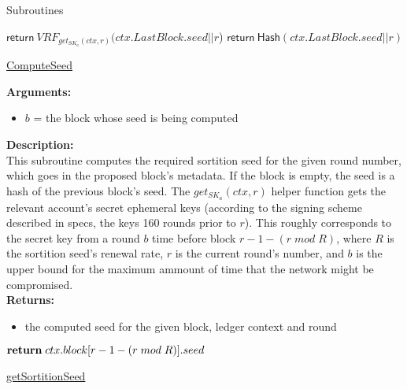 \documentclass[10pt,a4paper]{article}
\begin{document}
\begin{section}{Subroutines}
\begin{algorithm}[H]\label{algo:compute-seed}
    \begin{algorithmic}[1]
            \State $\mathsf{return} \ VRF_{get_{SK_a}(ctx, r)}(ctx.LastBlock.seed||r$)
        \Else
            \State $\mathsf{return} \ \mathsf{Hash}(ctx.LastBlock.seed||r)$
        \EndIf
    \EndFunction
    \end{algorithmic}
    \caption{\underline{ComputeSeed}}
\end{algorithm}


\noindent \textbf{Arguments:}
\begin{itemize}
    \item $b$ = the block whose seed is being computed
  \end{itemize}


\noindent \textbf{Description:}\\
This subroutine computes the required sortition seed for the given round number, 
which goes in the proposed block's metadata.
If the block is empty, the seed is a hash of the previous block's seed.
The $get_{SK_a}(ctx, r)$ helper function gets the relevant account's secret ephemeral keys (according to the signing scheme described in specs, the keys 160 rounds prior to $r$).
This roughly corresponds to the secret key from a round $b$ time before block $r-1-(r\;mod\;R)$, where $R$ is the sortition seed's renewal rate, $r$ is the current round's number,
and $b$ is the upper bound for the maximum ammount of time that the network might be compromised.\\

\noindent \textbf{Returns:}
\begin{itemize}
    \item the computed seed for the given block, ledger context and round
  \end{itemize}


\begin{algorithm}[H]\label{algo:get-sortition-seed}
    \begin{algorithmic}[1]
        
            $\Return\;ctx.block[r-1-(r\;mod\;R)].seed$

        \EndFunction
    \end{algorithmic}
    \caption{\underline{getSortitionSeed}}
\end{algorithm}


\end{section}
\end{document}

